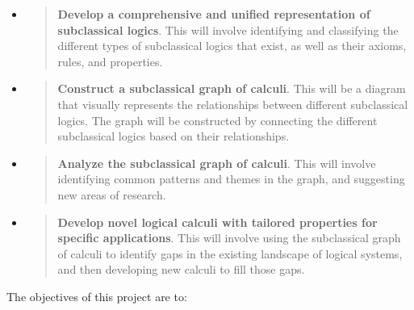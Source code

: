 \begin{itemize}
\item
  \begin{quote}
  \textbf{Develop a comprehensive and unified representation of
  subclassical logics}. This will involve identifying and classifying
  the different types of subclassical logics that exist, as well as
  their axioms, rules, and properties.
  \end{quote}
\item
  \begin{quote}
  \textbf{Construct a subclassical graph of calculi}. This will be a
  diagram that visually represents the relationships between different
  subclassical logics. The graph will be constructed by connecting the
  different subclassical logics based on their relationships.
  \end{quote}
\item
  \begin{quote}
  \textbf{Analyze the subclassical graph of calculi}. This will involve
  identifying common patterns and themes in the graph, and suggesting
  new areas of research.
  \end{quote}
\item
  \begin{quote}
  \textbf{Develop novel logical calculi with tailored properties for
  specific applications}. This will involve using the subclassical graph
  of calculi to identify gaps in the existing landscape of logical
  systems, and then developing new calculi to fill those gaps.
  \end{quote}
\end{itemize}

The objectives of this project are to:

